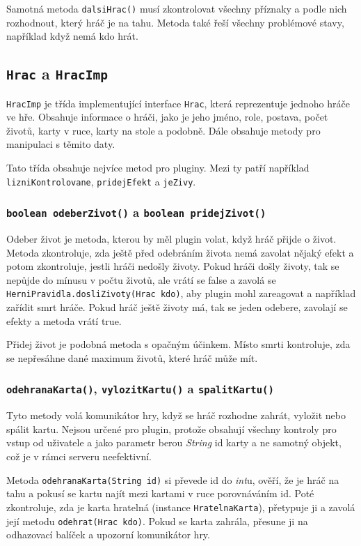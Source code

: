 Samotná metoda \texttt{dalsiHrac()} musí zkontrolovat všechny příznaky a podle nich rozhodnout, který hráč je na tahu. Metoda také řeší všechny problémové stavy, například když nemá kdo hrát.

\subsection{\texttt{Hrac} a \texttt{HracImp}}
\texttt{HracImp} je třída implementující interface \texttt{Hrac}, která reprezentuje jednoho hráče ve hře. Obsahuje informace o hráči, jako je jeho jméno, role, postava, počet životů, karty v ruce, karty na stole a podobně. Dále obsahuje metody pro manipulaci s těmito daty.

Tato třída obsahuje nejvíce metod pro pluginy. Mezi ty patří například \texttt{lizniKontrolovane}, \texttt{pridejEfekt} a \texttt{jeZivy}.



\subsubsection{\texttt{boolean odeberZivot()} a \texttt{boolean pridejZivot()}}
Odeber život je metoda, kterou by měl plugin volat, když hráč přijde o život. Metoda zkontroluje, zda ještě před odebráním života nemá zavolat nějaký efekt a potom zkontroluje, jestli hráči nedošly životy. Pokud hráči došly životy, tak se nepůjde do mínusu v počtu životů, ale vrátí se false a zavolá se \texttt{HerniPravidla.dosliZivoty(Hrac kdo)}, aby plugin mohl zareagovat a například zařídit smrt hráče. Pokud hráč ještě životy má, tak se jeden odebere, zavolají se efekty a metoda vrátí true.

Přidej život je podobná metoda s opačným účinkem. Místo smrti kontroluje, zda se nepřesáhne dané maximum životů, které hráč může mít.

\subsubsection[Akce s kartou]{\texttt{odehranaKarta()}, \texttt{vylozitKartu()} a \texttt{spalitKartu()}}
Tyto metody volá komunikátor hry, když se hráč rozhodne zahrát, vyložit nebo spálit kartu. Nejsou určené pro plugin, protože obsahují všechny kontroly pro vstup od uživatele a jako parametr berou \emph{String} id karty a ne samotný objekt, což je v rámci serveru neefektivní.

Metoda \texttt{odehranaKarta(String id)} si převede id do \emph{int}u, ověří, že je hráč na tahu a pokusí se kartu najít mezi kartami v ruce porovnáváním id. Poté zkontroluje, zda je karta hratelná (instance \texttt{HratelnaKarta}), přetypuje ji a zavolá její metodu \texttt{odehrat(Hrac kdo)}. Pokud se karta zahrála, přesune ji na odhazovací balíček a upozorní komunikátor hry.

